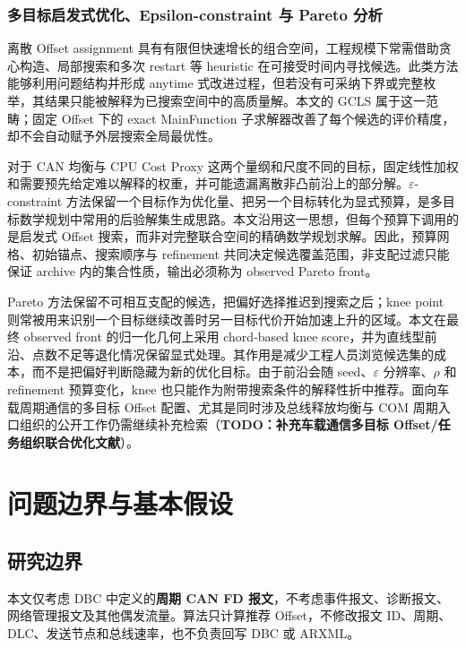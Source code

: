 \documentclass[UTF8,12pt,a4paper]{ctexart}
\begin{document}
\subsubsection{多目标启发式优化、Epsilon-constraint 与 Pareto 分析}

离散 Offset assignment 具有有限但快速增长的组合空间，工程规模下常需借助贪心构造、局部搜索和多次 restart 等 heuristic 在可接受时间内寻找候选。此类方法能够利用问题结构并形成 anytime 式改进过程，但若没有可采纳下界或完整枚举，其结果只能被解释为已搜索空间中的高质量解。本文的 GCLS 属于这一范畴；固定 Offset 下的 exact MainFunction 子求解器改善了每个候选的评价精度，却不会自动赋予外层搜索全局最优性。

对于 CAN 均衡与 CPU Cost Proxy 这两个量纲和尺度不同的目标，固定线性加权和需要预先给定难以解释的权重，并可能遗漏离散非凸前沿上的部分解。$\varepsilon$-constraint 方法保留一个目标作为优化量、把另一个目标转化为显式预算，是多目标数学规划中常用的后验解集生成思路\cite{mavrotas2009}。本文沿用这一思想，但每个预算下调用的是启发式 Offset 搜索，而非对完整联合空间的精确数学规划求解。因此，预算网格、初始锚点、搜索顺序与 refinement 共同决定候选覆盖范围，非支配过滤只能保证 archive 内的集合性质，输出必须称为 observed Pareto front。

Pareto 方法保留不可相互支配的候选，把偏好选择推迟到搜索之后；knee point 则常被用来识别一个目标继续改善时另一目标代价开始加速上升的区域\cite{debgupta2011}。本文在最终 observed front 的归一化几何上采用 chord-based knee score，并为直线型前沿、点数不足等退化情况保留显式处理。其作用是减少工程人员浏览候选集的成本，而不是把偏好判断隐藏为新的优化目标。由于前沿会随 seed、$\varepsilon$ 分辨率、$\rho$ 和 refinement 预算变化，knee 也只能作为附带搜索条件的解释性折中推荐。面向车载周期通信的多目标 Offset 配置、尤其是同时涉及总线释放均衡与 COM 周期入口组织的公开工作仍需继续补充检索（\textbf{TODO：补充车载通信多目标 Offset/任务组织联合优化文献}）。


\section{问题边界与基本假设}

\subsection{研究边界}

本文仅考虑 DBC 中定义的\textbf{周期 CAN FD 报文}，不考虑事件报文、诊断报文、网络管理报文及其他偶发流量。算法只计算推荐 Offset，不修改报文 ID、周期、DLC、发送节点和总线速率，也不负责回写 DBC 或 ARXML。
\end{document}
